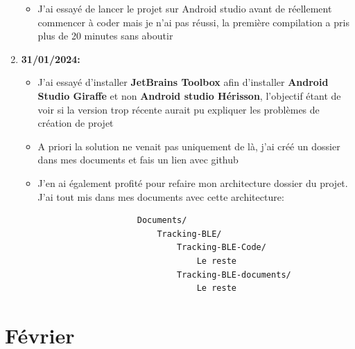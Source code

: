 \documentclass[10pt,a4paper]{book}
\begin{document}
\begin{enumerate}
\begin{itemize}
            \item J'ai essayé de lancer le projet sur Android studio avant de réellement commencer à coder mais je n'ai pas réussi, la première compilation a pris plus de 20 minutes sans aboutir
        \end{itemize}
    \item \textbf{31/01/2024:}
        \begin{itemize}
            \item J'ai essayé d'installer \textbf{JetBrains Toolbox} afin d'installer \textbf{Android Studio Giraffe} et non \textbf{Android studio Hérisson}, l'objectif étant de voir si la version trop récente aurait pu expliquer les problèmes de création de projet
            \item A priori la solution ne venait pas uniquement de là, j'ai créé un dossier dans mes documents et fais un lien avec github
            \item J'en ai également profité pour refaire mon architecture dossier du projet. J'ai tout mis dans mes documents avec cette architecture:
            \begin{center}
                \begin{verbatim}
                    Documents/
                        Tracking-BLE/
                            Tracking-BLE-Code/
                                Le reste
                            Tracking-BLE-documents/
                                Le reste
                \end{verbatim}
            \end{center}
        \end{itemize}
\end{enumerate}

\chapter{Février}
\end{document}
